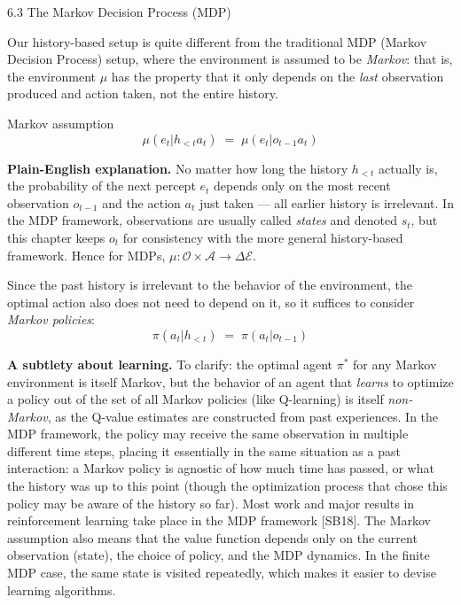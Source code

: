 \documentclass[aspectratio=169,10pt]{beamer}
\newcommand{\A}{\mathcal{A}}
\newcommand{\Ocal}{\mathcal{O}}
\newcommand{\Ecal}{\mathcal{E}}
\begin{document}
\begin{frame}[allowframebreaks]{6.3 The Markov Decision Process (MDP)}

Our history-based setup is quite different from the traditional MDP
(Markov Decision Process) setup, where the environment is assumed to be
\emph{Markov}: that is, the environment $\mu$ has the property that it only
depends on the \emph{last} observation produced and action taken, not the
entire history.

\begin{block}{Markov assumption}
\[
  \mu(e_t | h_{<t} a_t) \;=\; \mu(e_t | o_{t-1} a_t)
\]
\end{block}

\textbf{Plain-English explanation.} No matter how long the history $h_{<t}$
actually is, the probability of the next percept $e_t$ depends only on the
most recent observation $o_{t-1}$ and the action $a_t$ just taken --- all
earlier history is irrelevant. In the MDP framework, observations are
usually called \emph{states} and denoted $s_t$, but this chapter keeps
$o_t$ for consistency with the more general history-based framework. Hence
for MDPs, $\mu: \Ocal \times \A \to \Delta\Ecal$.

\vspace{0.2cm}
Since the past history is irrelevant to the behavior of the environment,
the optimal action also does not need to depend on it, so it suffices to
consider \emph{Markov policies}:
\[
  \pi(a_t|h_{<t}) \;=\; \pi(a_t|o_{t-1})
\]

\framebreak

\textbf{A subtlety about learning.} To clarify: the optimal agent
$\pi^{*}$ for any Markov environment is itself Markov, but the behavior of
an agent that \emph{learns} to optimize a policy out of the set of all
Markov policies (like Q-learning) is itself \emph{non-Markov}, as the
Q-value estimates are constructed from past experiences. In the MDP
framework, the policy may receive the same observation in multiple
different time steps, placing it essentially in the same situation as a
past interaction: a Markov policy is agnostic of how much time has passed,
or what the history was up to this point (though the optimization process
that chose this policy may be aware of the history so far). Most work and
major results in reinforcement learning take place in the MDP framework
[SB18]. The Markov assumption also means that the value function depends
only on the current observation (state), the choice of policy, and the MDP
dynamics. In the finite MDP case, the same state is visited repeatedly,
which makes it easier to devise learning algorithms.


\end{frame}
\end{document}
